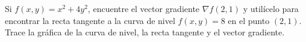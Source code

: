 \item Si $f(x, y) = x^2 + 4y^2$, encuentre el vector gradiente $\nabla f(2, 1)$ y utilícelo para encontrar la recta tangente a la curva de nivel $f(x, y) = 8$ en el punto $(2, 1)$. Trace la gráfica de la curva de nivel, la recta tangente y el vector gradiente.
